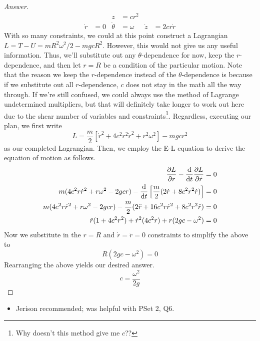 \documentclass[../notes.tex]{subfiles}
\begin{document}
\begin{itemize}
\begin{proof}[Answer]
\begin{align*}
                &&
                    z &= cr^2\\
            \dot{r} &= 0&
                \dot{\theta} &= \omega&
                    \dot{z} &= 2cr\dot{r}
        \end{align*}
        With so many constraints, we could at this point construct a Lagrangian $L=T-U=mR^2\omega^2/2-mgcR^2$. However, this would not give us any useful information. Thus, we'll substitute out any $\theta$-dependence for now, keep the $r$-dependence, and then let $r=R$ be a condition of the particular motion. Note that the reason we keep the $r$-dependence instead of the $\theta$-dependence is because if we substitute out all $r$-dependence, $c$ does not stay in the math all the way through. If we're still confused, we could always use the method of Lagrange undetermined multipliers, but that will definitely take longer to work out here due to the shear number of variables and constraints\footnote{Why doesn't this method give me $c$??}. Regardless, executing our plan, we first write
        \begin{equation*}
            L = \frac{m}{2}[\dot{r}^2+4c^2r^2\dot{r}^2+r^2\omega^2]-mgcr^2
        \end{equation*}
        as our completed Lagrangian. Then, we employ the E-L equation to derive the equation of motion as follows.
        \begin{align*}
            \pdv{L}{r}-\dv{t}\pdv{L}{\dot{r}} &= 0\\
            m(4c^2r\dot{r}^2+r\omega^2-2gcr)-\dv{t}\left[ \frac{m}{2}(2\dot{r}+8c^2r^2\dot{r}) \right] &= 0\\
            m(4c^2r\dot{r}^2+r\omega^2-2gcr)-\frac{m}{2}(2\ddot{r}+16c^2r\dot{r}^2+8c^2r^2\ddot{r}) &= 0\\
            \ddot{r}(1+4c^2r^2)+\dot{r}^2(4c^2r)+r(2gc-\omega^2) &= 0
        \end{align*}
        Now we substitute in the $r=R$ and $\dot{r}=\ddot{r}=0$ constraints to simplify the above to
        \begin{equation*}
            R(2gc-\omega^2) = 0
        \end{equation*}
        Rearranging the above yields our desired answer.
        \begin{equation*}
            c = \frac{\omega^2}{2g}
        \end{equation*}
    \end{proof}
    \begin{itemize}
        \item Jerison recommended; was helpful with PSet 2, Q6.

\end{itemize}
\end{itemize}
\end{document}
